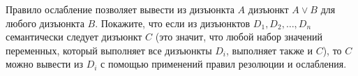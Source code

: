 Правило ослабление позволяет вывести из дизъюнкта $A$ дизъюнкт $A \lor B$ для любого дизъюнкта $B$. Покажите, что если из
дизъюнктов $D_1, D_2, \dots, D_n$ семантически следует дизъюнкт $C$ (это значит, что любой набор значений переменных, который
выполняет все дизъюнкты $D_i$, выполняет также и $C$), то $C$ можно вывести из $D_i$ с помощью применений правил резолюции и
ослабления.
